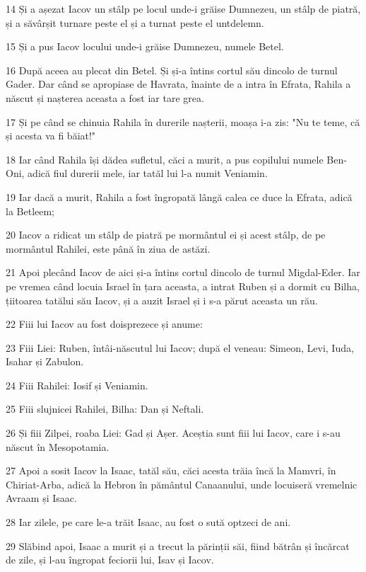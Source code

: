 \par 14 Și a așezat Iacov un stâlp pe locul unde-i grăise Dumnezeu, un stâlp de piatră, și a săvârșit turnare peste el și a turnat peste el untdelemn.
\par 15 Și a pus Iacov locului unde-i grăise Dumnezeu, numele Betel.
\par 16 După aceea au plecat din Betel. Și și-a întins cortul său dincolo de turnul Gader. Dar când se apropiase de Havrata, înainte de a intra în Efrata, Rahila a născut și nașterea aceasta a fost iar tare grea.
\par 17 Și pe când se chinuia Rahila în durerile nașterii, moașa i-a zis: "Nu te teme, că și acesta va fi băiat!"
\par 18 Iar când Rahila își dădea sufletul, căci a murit, a pus copilului numele Ben-Oni, adică fiul durerii mele, iar tatăl lui l-a numit Veniamin.
\par 19 Iar dacă a murit, Rahila a fost îngropată lângă calea ce duce la Efrata, adică la Betleem;
\par 20 Iacov a ridicat un stâlp de piatră pe mormântul ei și acest stâlp, de pe mormântul Rahilei, este până în ziua de astăzi.
\par 21 Apoi plecând Iacov de aici și-a întins cortul dincolo de turnul Migdal-Eder. Iar pe vremea când locuia Israel în țara aceasta, a intrat Ruben și a dormit cu Bilha, țiitoarea tatălui său Iacov, și a auzit Israel și i s-a părut aceasta un rău.
\par 22 Fiii lui Iacov au fost doisprezece și anume:
\par 23 Fiii Liei: Ruben, întâi-născutul lui Iacov; după el veneau: Simeon, Levi, Iuda, Isahar și Zabulon.
\par 24 Fiii Rahilei: Iosif și Veniamin.
\par 25 Fiii slujnicei Rahilei, Bilha: Dan și Neftali.
\par 26 Și fiii Zilpei, roaba Liei: Gad și Așer. Aceștia sunt fiii lui Iacov, care i s-au născut în Mesopotamia.
\par 27 Apoi a sosit Iacov la Isaac, tatăl său, căci acesta trăia încă la Mamvri, în Chiriat-Arba, adică la Hebron în pământul Canaanului, unde locuiseră vremelnic Avraam și Isaac.
\par 28 Iar zilele, pe care le-a trăit Isaac, au fost o sută optzeci de ani.
\par 29 Slăbind apoi, Isaac a murit și a trecut la părinții săi, fiind bătrân și încărcat de zile, și l-au îngropat feciorii lui, Isav și Iacov.

